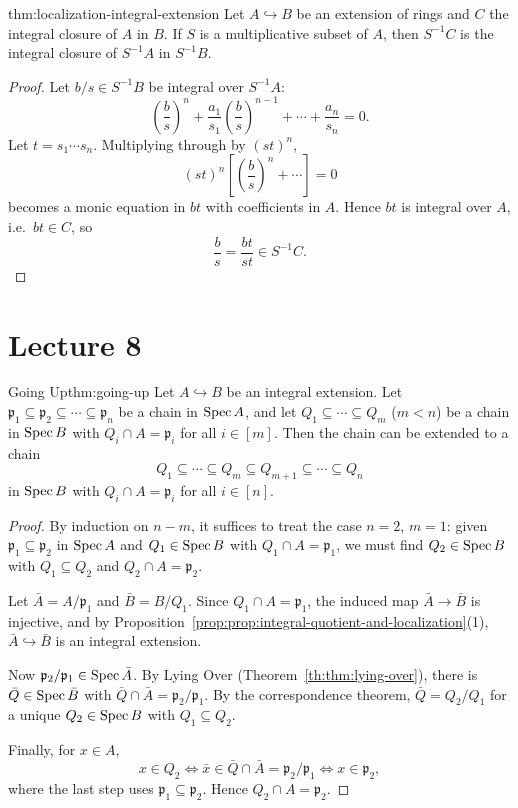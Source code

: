 \begin{theorem}{}{thm:localization-integral-extension}
Let $A \hookrightarrow B$ be an extension of rings and $C$ the integral closure of $A$ in $B$. If $S$ is a multiplicative subset of $A$, then $S^{-1}C$ is the integral closure of $S^{-1}A$ in $S^{-1}B$.
\end{theorem}

\begin{proof}
Let $b/s \in S^{-1}B$ be integral over $S^{-1}A$:
\[
\left(\frac bs\right)^n + \frac{a_1}{s_1}\left(\frac bs\right)^{n-1} + \cdots + \frac{a_n}{s_n} = 0.
\]
Let $t = s_1\cdots s_n$. Multiplying through by $(st)^n$,
\[
(st)^n\left[\left(\frac bs\right)^n + \cdots\right] = 0
\]
becomes a monic equation in $bt$ with coefficients in $A$. Hence $bt$ is integral over $A$, i.e.\ $bt \in C$, so
\[
\frac bs = \frac{bt}{st} \in S^{-1}C.
\]
\end{proof}

\section{Lecture 8}

\begin{theorem}{Going Up}{thm:going-up}
Let $A \hookrightarrow B$ be an integral extension. Let $\mathfrak p_1 \subseteq \mathfrak p_2 \subseteq \cdots \subseteq \mathfrak p_n$ be a chain in $\operatorname{Spec} A$, and let $Q_1 \subseteq \cdots \subseteq Q_m$ ($m < n$) be a chain in $\operatorname{Spec} B$ with $Q_i \cap A = \mathfrak p_i$ for all $i \in [m]$. Then the chain can be extended to a chain
\[
Q_1 \subseteq \cdots \subseteq Q_m \subseteq Q_{m+1} \subseteq \cdots \subseteq Q_n
\]
in $\operatorname{Spec} B$ with $Q_i \cap A = \mathfrak p_i$ for all $i \in [n]$.
\end{theorem}

\begin{proof}
By induction on $n - m$, it suffices to treat the case $n = 2$, $m = 1$: given $\mathfrak p_1 \subseteq \mathfrak p_2$ in $\operatorname{Spec} A$ and $Q_1 \in \operatorname{Spec} B$ with $Q_1 \cap A = \mathfrak p_1$, we must find $Q_2 \in \operatorname{Spec} B$ with $Q_1 \subseteq Q_2$ and $Q_2 \cap A = \mathfrak p_2$.

Let $\bar A = A/\mathfrak p_1$ and $\bar B = B/Q_1$. Since $Q_1 \cap A = \mathfrak p_1$, the induced map $\bar A \to \bar B$ is injective, and by Proposition~\ref{prop:prop:integral-quotient-and-localization}(1), $\bar A \hookrightarrow \bar B$ is an integral extension.

Now $\mathfrak p_2/\mathfrak p_1 \in \operatorname{Spec} \bar A$. By Lying Over (Theorem~\ref{th:thm:lying-over}), there is $\bar Q \in \operatorname{Spec} \bar B$ with $\bar Q \cap \bar A = \mathfrak p_2/\mathfrak p_1$. By the correspondence theorem, $\bar Q = Q_2/Q_1$ for a unique $Q_2 \in \operatorname{Spec} B$ with $Q_1 \subseteq Q_2$.

Finally, for $x \in A$,
\[
x \in Q_2 \iff \bar x \in \bar Q \cap \bar A = \mathfrak p_2/\mathfrak p_1 \iff x \in \mathfrak p_2,
\]
where the last step uses $\mathfrak p_1 \subseteq \mathfrak p_2$. Hence $Q_2 \cap A = \mathfrak p_2$.
\end{proof}

